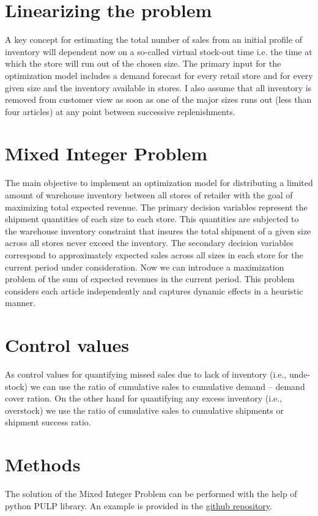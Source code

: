 \documentclass[11pt,fleqn]{book} %
\begin{document}
\begin{remark}
\begin{itemize}
\section{Linearizing the problem}
A key concept for estimating the total number of sales from an initial profile of inventory will dependent now on a so-called virtual stock-out time i.e. the time at which the store will run out of the chosen size. The primary input for the optimization model includes a demand forecast for every retail store and for every given size and the inventory available in stores. I also assume that all inventory is removed from customer view as soon as one of the major sizes runs out (less than four articles) at any point between successive replenishments.

\section{Mixed Integer Problem}
The main objective to implement an optimization model for distributing a limited amount of warehouse inventory between all stores of retailer with the goal of maximizing total expected revenue. The primary decision variables represent the shipment quantities of each size to each store. This quantities are subjected to the warehouse inventory constraint that insures the total shipment of a given size across all stores never exceed the inventory. The secondary decision variables correspond to approximately expected sales across all sizes in each store for the current period under consideration. Now we can introduce a maximization problem of the sum of expected revenues in the current period. This problem considers each article independently and captures dynamic effects in a heuristic manner.

\section{Control values}
As control values  for quantifying missed
sales due to lack of inventory (i.e., unde-stock) we can use the
ratio of cumulative sales to cumulative demand -- demand cover ration. On the other hand for quantifying any excess inventory (i.e., overstock) we use the ratio of cumulative sales to cumulative shipments or shipment success ratio.

\section{Methods}
The solution of the Mixed Integer Problem can be performed with the help of python PULP library. An example is provided in the \href{https://github.com/sergeplatonov/Data_problems/tree/master/Logistics%20optimization}{github repository}.



\end{itemize}
\end{remark}
\end{document}
